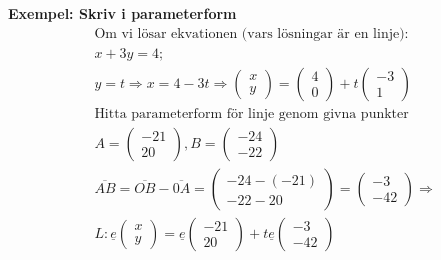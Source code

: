 \begin{multicols}{2}
\textbf{Exempel: Skriv i parameterform}
\begin{align*} 
  &\text{Om vi lösar ekvationen (vars lösningar är en linje):} \\ 
  &x+3y=4; \\
  &y=t \Rightarrow x=4-3t \Rightarrow 
  \begin{pmatrix} x \\ y \end{pmatrix} =
  \begin{pmatrix} 4 \\ 0 \end{pmatrix} +
  t\begin{pmatrix} -3 \\ 1 \end{pmatrix} \\
  &\text{Hitta parameterform för linje genom givna punkter} \\
  &A= \begin{pmatrix} -21 \\ 20 \end{pmatrix},
  B= \begin{pmatrix} -24 \\ -22 \end{pmatrix} \\
  &\overline{AB} = \overline{OB}-\overline{0A} =
  \begin{pmatrix} -24-(-21) \\ -22-20 \end{pmatrix} =
  \begin{pmatrix} -3 \\ -42 \end{pmatrix} \Rightarrow \\
  &L:\underline{e}\begin{pmatrix} x \\ y \end{pmatrix} =
  \underline{e}\begin{pmatrix} -21 \\ 20 \end{pmatrix} +
  t\underline{e}\begin{pmatrix} -3 \\ -42 \end{pmatrix} \\
\end{align*}



\end{multicols}
